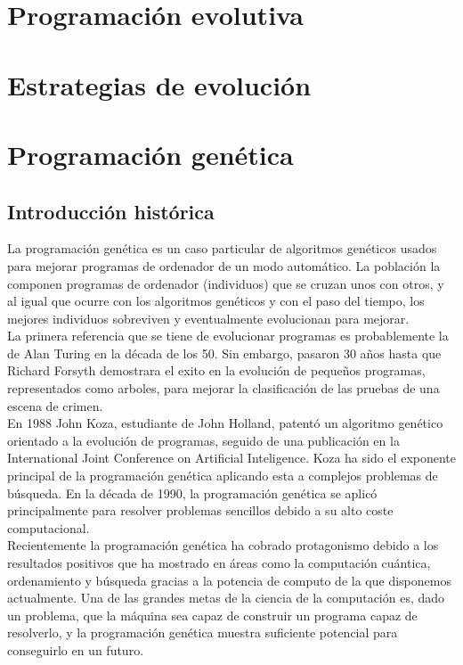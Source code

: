 \documentclass[12pt]{article} \usepackage[utf8x]{inputenc}
\begin{document}
\section{Programación evolutiva}

\section{Estrategias de evolución}

\section{Programación genética}


\subsection{Introducción histórica} 

La programación genética es un caso particular de algoritmos genéticos usados para mejorar programas de ordenador de un modo automático. La población la componen programas de  ordenador (individuos) que se cruzan unos con otros, y al igual que ocurre con los algoritmos genéticos y con el paso del tiempo, los mejores individuos sobreviven y eventualmente evolucionan para mejorar. \\

La primera referencia que se tiene de evolucionar programas es probablemente la de Alan Turing en la década de los 50. Sin embargo, pasaron 30 años hasta que Richard Forsyth demostrara el exito en la evolución de pequeños programas, representados como arboles, para mejorar la clasificación de las pruebas de una escena de crimen.\\

En 1988 John Koza, estudiante de John Holland, patentó un algoritmo genético orientado a la evolución de programas, seguido de una publicación en la International Joint Conference on Artificial Inteligence. Koza ha sido el exponente principal de la programación genética aplicando esta a complejos problemas de búsqueda.
En la década de 1990, la programación genética se aplicó principalmente para resolver problemas sencillos debido a su alto coste computacional.\\

Recientemente la programación genética ha cobrado protagonismo debido a los resultados positivos que ha mostrado en áreas como la computación cuántica, ordenamiento y búsqueda gracias a la potencia de computo de la que disponemos actualmente. Una de las grandes metas de la ciencia de la computación es, dado un problema, que la máquina sea capaz de construir un programa capaz de resolverlo, y la programación genética muestra suficiente potencial para conseguirlo en un futuro.\\
\end{document}
